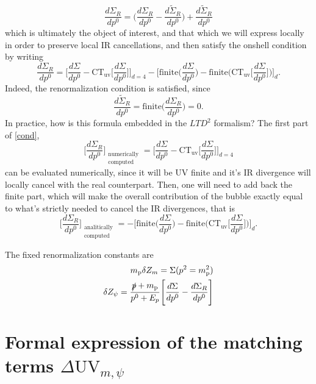\documentclass[11pt]{article}
\begin{document}
\begin{equation}
\frac{d\Sigma_R}{dp^0}=\Bigg(\frac{d\Sigma_R}{dp^0}-\frac{d\tilde\Sigma_R}{dp^0}\Bigg)+\frac{d\tilde\Sigma_R}{dp^0}
\end{equation}
which is ultimately the object of interest, and that which we will express locally in order to preserve local IR cancellations, and then satisfy the onshell condition by writing
\begin{equation}\label{cond}
\frac{d\Sigma_R}{dp^0}=\Bigg[\frac{d\Sigma}{dp^0}-\text{CT}_\text{uv}\Bigg[\frac{d\Sigma}{dp^0}\Bigg]\Bigg]_{d=4}-\Bigg[\text{finite}\Bigg(\frac{d\Sigma}{dp^0}\Bigg)-\text{finite}\Bigg(\text{CT}_\text{uv}\Bigg[\frac{d\Sigma}{dp^0}\Bigg]\Bigg)\Bigg]_d.
\end{equation}
Indeed, the renormalization condition is satisfied, since
\begin{equation}
\frac{d\tilde\Sigma_R}{dp^0}=\text{finite}\Bigg(\frac{d\Sigma_R}{dp^0}\Bigg)=0.\end{equation}
In practice, how is this formula embedded in the $LTD^2$ formalism? The first part of \eqref{cond},
\begin{equation}
\Bigg[\frac{d\Sigma_R}{dp^0}\Bigg]_{\substack{\text{numerically}\\ \text{computed}}}=\Bigg[\frac{d\Sigma}{dp^0}-\text{CT}_\text{uv}\Bigg[\frac{d\Sigma}{dp^0}\Bigg]\Bigg]_{d=4}
\end{equation}
 can be evaluated numerically, since it will be UV finite and it's IR divergence will locally cancel with the real counterpart. Then, one will need to add back the finite part, which will make the overall contribution of the bubble exactly equal to what's strictly needed to cancel the IR divergences, that is
  \begin{equation}
\Bigg[\frac{d\Sigma_R}{dp^0}\Bigg]_{\substack{\text{analitically}\\ \text{computed}}}=-\Bigg[\text{finite}\Bigg(\frac{d\Sigma}{dp^0}\Bigg)-\text{finite}\Bigg(\text{CT}_\text{uv}\Bigg[\frac{d\Sigma}{dp^0}\Bigg]\Bigg)\Bigg]_d.
\end{equation}

The fixed renormalization constants are
\begin{align}
m_\text{p} \delta Z_m=\Sigma(p^2=m_\text{p}^2) \\
\delta Z_\psi =\frac{\slashed p + m_\text{p}}{p^0+E_p}\Bigg[\frac{d\Sigma}{dp^0}-\frac{d\Sigma_R}{dp^0}\Bigg]
\end{align}


\section{Formal expression of the matching terms $\Delta \textrm{UV}_{m,\psi}$}
\label{sec:formalDeltaUV}
\end{document}
